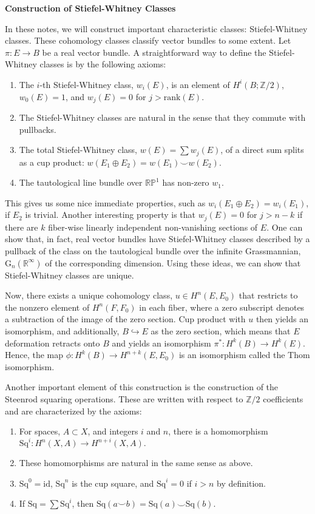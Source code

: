 \documentclass[12pt]{book}
\theoremstyle{definition}
\theoremstyle{remark}
\newcommand{\BR}{\mathbb R}
\newcommand{\BZ}{\mathbb Z}
\newcommand{\Sq}{\mathrm{Sq}}
\newcommand{\rank}{\mathrm{rank}}
\newcommand{\id}{\mathrm{id}}
\newcommand{\s}{\subset}
\begin{document}
\begin{center}
\textbf{\Large Construction of Stiefel-Whitney Classes}
\end{center}

In these notes, we will construct important characteristic classes: Stiefel-Whitney classes. These cohomology classes classify vector bundles to some extent. Let $\pi : E \to B$ be a real vector bundle. A straightforward way to define the Stiefel-Whitney classes is by the following axioms:
\begin{enumerate}
\item The $i$-th Stiefel-Whitney class, $w_{i}(E)$, is an element of $H^{i}(B;\BZ/2)$, $w_{0}(E) = 1$, and $w_{j}(E) = 0$ for $j > \rank(E).$
\item The Stiefel-Whitney classes are natural in the sense that they commute with pullbacks.
\item The total Stiefel-Whitney class, $w(E) = \sum w_{j}(E)$, of a direct sum splits as a cup product: $w(E_{1} \oplus E_{2}) = w(E_{1}) \smile w(E_{2}).$
\item The tautological line bundle over $\mathbb{RP}^{1}$ has non-zero $w_{1}.$
\end{enumerate}

This gives us some nice immediate properties, such as $w_{i}(E_{1} \oplus E_{2}) = w_{i}(E_{1})$, if $E_{2}$ is trivial. Another interesting property is that $w_{j}(E) = 0$ for $j > n - k$ if there are $k$ fiber-wise linearly independent non-vanishing sections of $E.$ One can show that, in fact, real vector bundles have Stiefel-Whitney classes described by a pullback of the class on the tautological bundle over the infinite Grassmannian, $\mathrm{G}_{n}(\BR^{\infty})$ of the corresponding dimension. Using these ideas, we can show that Stiefel-Whitney classes are unique.

Now, there exists a unique cohomology class, $u \in H^{n}(E,E_{0})$ that restricts to the nonzero element of $H^{n}(F,F_{0})$ in each fiber, where a zero subscript denotes a subtraction of the image of the zero section. Cup product with $u$ then yields an isomorphism, and additionally, $B \hookrightarrow E$ as the zero section, which means that $E$ deformation retracts onto $B$ and yields an isomorphism $\pi^{*} : H^{k}(B) \to H^{k}(E).$ Hence, the map $\phi : H^{k}(B) \to H^{n + k}(E,E_{0})$ is an isomorphism called the Thom isomorphism.

Another important element of this construction is the construction of the Steenrod squaring operations. These are written with respect to $\BZ/2$ coefficients and are characterized by the axioms:
\begin{enumerate}
\item For spaces, $A \s X$, and integers $i$ and $n$, there is a homomorphism $\Sq^{i} : H^{n}(X,A) \to H^{n + i}(X,A).$
\item These homomorphisms are natural in the same sense as above.
\item $\Sq^{0} = \id$, $\Sq^{n}$ is the cup square, and $\Sq^{i} = 0$ if $i > n$ by definition.
\item If $\Sq = \sum \Sq^{i}$, then $\Sq(a \smile b) = \Sq(a) \smile \Sq(b).$
\end{enumerate}
\end{document}
